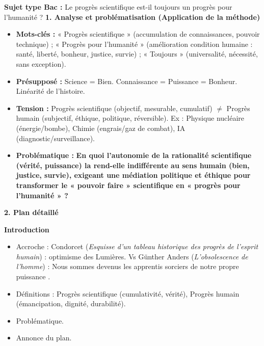 \documentclass[11pt]{article}
\begin{document}
\begin{exoresolu}
    \textbf{Sujet type Bac :} \guillemotleft Le progrès scientifique est-il toujours un progrès pour l'humanité ? \guillemotright
    \tcblower
    \textbf{1. Analyse et problématisation (Application de la méthode)}
    \begin{itemize}
        \item \textbf{Mots-clés :} « Progrès scientifique » (accumulation de connaissances, pouvoir technique) ; « Progrès pour l'humanité » (amélioration condition humaine : santé, liberté, bonheur, justice, survie) ; « Toujours » (universalité, nécessité, sans exception).
        \item \textbf{Présupposé :} Science = Bien. Connaissance = Puissance = Bonheur. Linéarité de l'histoire.
        \item \textbf{Tension :} Progrès scientifique (objectif, mesurable, cumulatif) $\neq$ Progrès humain (subjectif, éthique, politique, réversible). Ex : Physique nucléaire (énergie/bombe), Chimie (engrais/gaz de combat), IA (diagnostic/surveillance).
        \item \textbf{Problématique :} \textbf{En quoi l'autonomie de la rationalité scientifique (vérité, puissance) la rend-elle indifférente au sens humain (bien, justice, survie), exigeant une médiation politique et éthique pour transformer le « pouvoir faire » scientifique en « progrès pour l'humanité » ?}
    \end{itemize}

    \textbf{2. Plan détaillé}

    \textbf{Introduction}
    \begin{itemize}
        \item Accroche : Condorcet (\emph{Esquisse d'un tableau historique des progrès de l'esprit humain}) : optimisme des Lumières. Vs Günther Anders (\emph{L'obsolescence de l'homme}) : \guillemotleft Nous sommes devenus les apprentis sorciers de notre propre puissance \guillemotright.
        \item Définitions : Progrès scientifique (cumulativité, vérité), Progrès humain (émancipation, dignité, durabilité).
        \item Problématique.
        \item Annonce du plan.
    \end{itemize}


\end{exoresolu}
\end{document}
